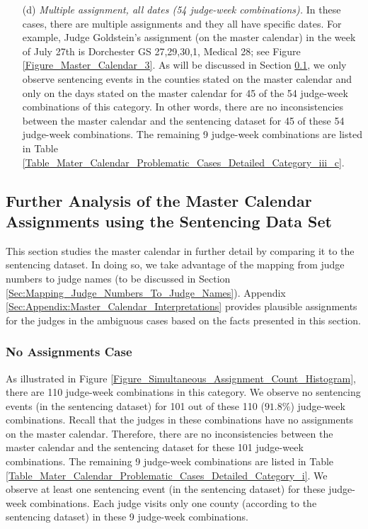 \documentclass[11pt, oneside]{article}   	%
\theoremstyle{ModifiedStyle}
\begin{document}
\begin{itemize}
				\item[(d)] \emph{Multiple assignment, all dates (54 judge-week combinations).} In these cases, there are multiple assignments and they all have specific dates. For example, Judge Goldstein's assignment (on the master calendar) in the week of July 27th is Dorchester GS 27,29,30,1, Medical 28; see Figure \ref{Figure_Master_Calendar_3}. As will be discussed in Section \ref{Sec:Master_Calendar:Further_Analysis_of_Some_Assignments}, we only observe sentencing events in the counties stated on the master calendar and only on the days stated on the master calendar for 45 of the 54 judge-week combinations of this category. In other words, there are no inconsistencies between the master calendar and the sentencing dataset for 45 of these 54 judge-week combinations. The remaining 9 judge-week combinations are listed in Table \ref{Table_Mater_Calendar_Problematic_Cases_Detailed_Category_iii_c}.
			\end{itemize}

	\subsection{Further Analysis of the Master Calendar Assignments using the Sentencing Data Set}
		\label{Sec:Master_Calendar:Further_Analysis_of_Some_Assignments}

		This section studies the master calendar in further detail by comparing it to the sentencing dataset. In doing so, we take advantage of the mapping from judge numbers to judge names (to be discussed in Section \ref{Sec:Mapping_Judge_Numbers_To_Judge_Names}). Appendix \ref{Sec:Appendix:Master_Calendar_Interpretations} provides plausible assignments for the judges in the ambiguous cases based on the facts presented in this section.

		\subsubsection{No Assignments Case}
			\label{Sec:Master_Calendar:Further_Analysis_of_Some_Assignments:Category_i}
			As illustrated in Figure \ref{Figure_Simultaneous_Assignment_Count_Histogram}, there are 110 judge-week combinations in this category. We observe no sentencing events (in the sentencing dataset) for 101 out of these 110 ($91.8\%$) judge-week combinations. Recall that the judges in these combinations have no assignments on the master calendar. Therefore, there are no inconsistencies between the master calendar and the sentencing dataset for these 101 judge-week combinations. The remaining 9 judge-week combinations are listed in Table \ref{Table_Mater_Calendar_Problematic_Cases_Detailed_Category_i}. We observe at least one sentencing event (in the sentencing dataset) for these judge-week combinations. Each judge visits only one county (according to the sentencing dataset) in these 9 judge-week combinations.
\end{document}
